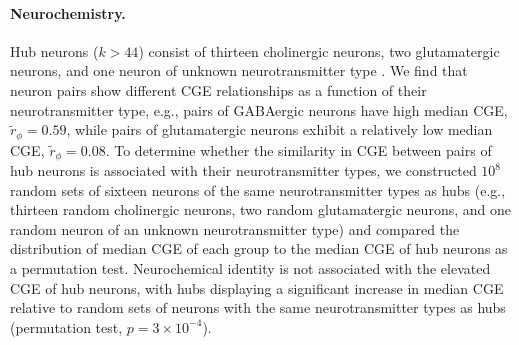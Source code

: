 \documentclass[10pt,letterpaper]{article}
\begin{document}
{%




\paragraph{Neurochemistry.}
Hub neurons ($k > 44$) consist of thirteen cholinergic neurons, two glutamatergic neurons, and one neuron of unknown neurotransmitter type \cite{Pereira:2015er}.
We find that neuron pairs show different CGE relationships as a function of their neurotransmitter type, e.g., pairs of GABAergic neurons have high median CGE, $\tilde{r}_\phi = 0.59$, while pairs of glutamatergic neurons exhibit a relatively low median CGE, $\tilde{r}_\phi = 0.08$.
To determine whether the similarity in CGE between pairs of hub neurons \color{teal} is associated with \color{black} their neurotransmitter types, we constructed $10^8$ random sets of sixteen neurons of the same neurotransmitter types as hubs (e.g., thirteen random cholinergic neurons, two random glutamatergic neurons, and one random neuron of an unknown neurotransmitter type) and compared the distribution of median CGE of each group to the median CGE of hub neurons as a permutation test.
Neurochemical identity \color{teal} is not associated with \color{black} the elevated CGE of hub neurons, with hubs displaying a significant increase in median CGE relative to random sets of neurons with the same neurotransmitter types as hubs (permutation test, $p = 3\times10^{-4}$).

}
\end{document}

